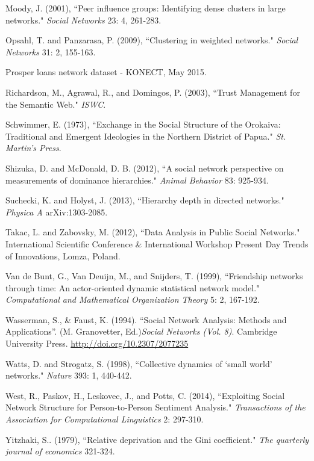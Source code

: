 \documentclass[3p,times]{elsarticle}
\begin{document}
\begin{thebibliography}{9}
	Moody, J. (2001),
	``Peer influence groups: Identifying dense clusters in large networks."
	\textit{Social Networks} 23: 4, 261-283.
	
	Opsahl, T. and Panzarasa, P. (2009),
	``Clustering in weighted networks."
	\textit{Social Networks} 31: 2, 155-163.
	
	Prosper loans network dataset - KONECT, May 2015.
	
	Richardson, M., Agrawal, R., and Domingos, P. (2003),
	``Trust Management for the Semantic Web." \textit{ISWC}.
	
	Schwimmer, E. (1973),
	``Exchange in the Social Structure of the Orokaiva: Traditional and Emergent Ideologies in the Northern District of Papua." \textit{St. Martin's Press}.
	
	Shizuka, D. and McDonald, D. B. (2012),
	``A social network perspective on measurements of dominance hierarchies." 
	\textit{Animal Behavior} 83: 925-934.
	
	Suchecki, K. and Holyst, J. (2013),
	``Hierarchy depth in directed networks." 
	\textit{Physica A} arXiv:1303-2085.
	
	Takac, L. and Zabovsky, M. (2012),
	``Data Analysis in Public Social Networks."
	International Scientific Conference \& International Workshop Present Day Trends of Innovations, Lomza, Poland.
	
	Van de Bunt, G., Van Deuijn, M., and Snijders, T. (1999),
	``Friendship networks through time: An actor-oriented dynamic statistical network model."
	\textit{Computational and Mathematical Organization Theory} 5: 2, 167-192.
	
	Wasserman, S., \& Faust, K. (1994). ``Social Network Analysis: Methods and Applications''. (M. Granovetter, Ed.)\emph{Social Networks (Vol. 8)}. Cambridge University Press. \href{http://doi.org/10.2307/2077235}{http://doi.org/10.2307/2077235}
	
	Watts, D. and Strogatz, S. (1998),
	``Collective dynamics of `small world' networks."
	\textit{Nature} 393: 1, 440-442.
	
	West, R., Paskov, H., Leskovec, J., and Potts, C. (2014),
	``Exploiting Social Network Structure for Person-to-Person Sentiment Analysis."
	\textit{Transactions of the Association for Computational Linguistics} 2: 297-310.
	
	Yitzhaki, S.. (1979), ``Relative deprivation and the Gini coefficient." \emph{The quarterly journal of economics} 321-324.

	


    
    
    
\end{thebibliography}
\end{document}
